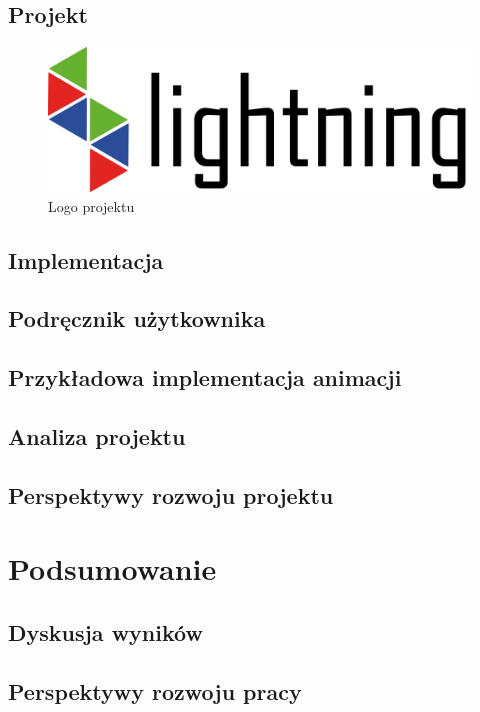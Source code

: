 \documentclass[12pt]{report}
\begin{document}
\section{Projekt}

\begin{figure}[h]
\centering
\includegraphics[width=.85\textwidth]{../resource/logo.png}
\caption{Logo projektu}
\end{figure}

\section{Implementacja}

\section{Podręcznik użytkownika}

\section{Przykładowa implementacja animacji}

\section{Analiza projektu}

\section{Perspektywy rozwoju projektu}

\chapter{Podsumowanie}

\section{Dyskusja wyników}

\section{Perspektywy rozwoju pracy}
\end{document}

